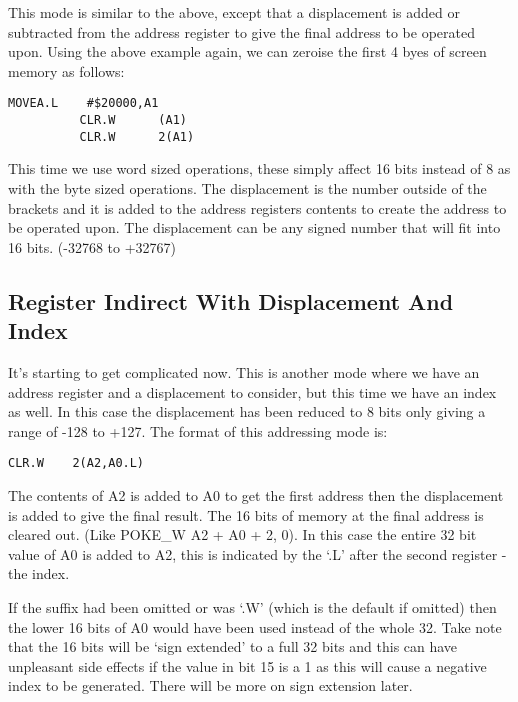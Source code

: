 This mode is similar to the above, except that a displacement is
      added or subtracted from the address register to give the final address
      to be operated upon. Using the above example again, we can zeroise the
      first 4 byes of screen memory as follows: 
\begin{lstlisting}[firstnumber=1,]
          MOVEA.L    #$20000,A1
          CLR.W      (A1)
          CLR.W      2(A1) 
\end{lstlisting}


This time we use word sized operations, these simply affect 16
      bits instead of 8 as with the byte sized operations. The displacement is
      the number outside of the brackets and it is added to the address
      registers contents to create the address to be operated upon. The
      displacement can be any signed number that will fit into 16 bits.
      (-{}32768 to +32767)

\subsection{Register Indirect With Displacement And Index}\address{Register Indirect With Displacement And Index}

It's starting to get complicated now. This is another mode where
      we have an address register and a displacement to consider, but this
      time we have an index as well. In this case the displacement has been
      reduced to 8 bits only giving a range of -{}128 to +127. The format of
      this addressing mode is:

\begin{lstlisting}[firstnumber=1,]
          CLR.W    2(A2,A0.L)
\end{lstlisting}

The contents of A2 is added to A0 to get the first address then
      the displacement is added to give the final result. The 16 bits of
      memory at the final address is cleared out. (Like POKE\_W A2 + A0 + 2,
      0). In this case the entire 32 bit value of A0 is added to A2, this is
      indicated by the `.L' after the second register -{} the index.

If the suffix had been omitted or was `.W' (which is the default
      if omitted) then the lower 16 bits of A0 would have been used instead of
      the whole 32. Take note that the 16 bits will be `sign extended' to a
      full 32 bits and this can have unpleasant side effects if the value in
      bit 15 is a 1 as this will cause a negative index to be generated. There
      will be more on sign extension later.

